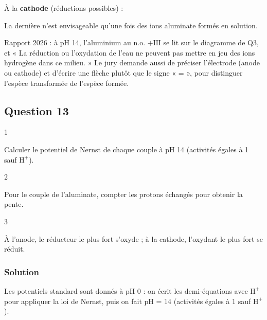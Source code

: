 \documentclass[11pt,a4paper]{article}
\newcommand{\equationajustee}[1]{%
  \sbox{\boiteequation}{$\displaystyle #1$}%
  \ifdim\wd\boiteequation>\linewidth
    \[\resizebox{\linewidth}{!}{\usebox{\boiteequation}}\]%
  \else
    \[#1\]%
  \fi}
\begin{document}
À la \textbf{cathode} (réductions possibles) :
\equationajustee{2\,\mathrm{H_2O}+2\,e^-\longrightarrow\mathrm{H_2(g)}+2\,\mathrm{HO^-}}
\equationajustee{[\mathrm{Al(OH)_4}]^-+3\,e^-\longrightarrow\mathrm{Al(s)}+4\,\mathrm{HO^-}}

La dernière n'est envisageable qu'une fois des ions aluminate formés en solution.

\begin{jury}

Rapport 2026 : à pH 14, l'aluminium au n.o. \(+\mathrm{III}\) se lit sur le diagramme de Q3, et « La réduction ou l'oxydation de l'eau ne peuvent pas mettre en jeu des ions hydrogène dans ce milieu. » Le jury demande aussi de préciser l'électrode (anode ou cathode) et d'écrire une flèche plutôt que le signe « = », pour distinguer l'espèce transformée de l'espèce formée.

\end{jury}

\hypertarget{question-13}{%
\subsection{Question 13}\label{question-13}}

\begin{indication}{1}

Calculer le potentiel de Nernst de chaque couple à pH 14 (activités égales à 1 sauf \(\mathrm{H^+}\)).

\end{indication}

\begin{indication}{2}

Pour le couple de l'aluminate, compter les protons échangés pour obtenir la pente.

\end{indication}

\begin{indication}{3}

À l'anode, le réducteur le plus fort s'oxyde ; à la cathode, l'oxydant le plus fort se réduit.

\end{indication}

\hypertarget{solution-12}{%
\subsubsection{Solution}\label{solution-12}}

Les potentiels standard sont donnés à pH 0 : on écrit les demi-équations avec \(\mathrm{H^+}\) pour appliquer la loi de Nernst, puis on fait pH = 14 (activités égales à 1 sauf \(\mathrm{H^+}\)).
\end{document}
